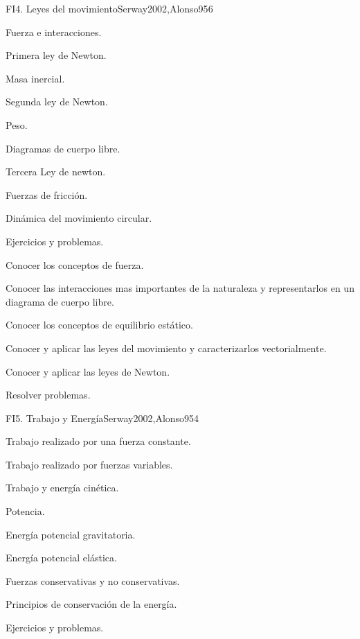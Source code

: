 \begin{sumilla}
\begin{unit}{FI4. Leyes del movimiento}{Serway2002,Alonso95}{6}
\begin{topicos}
      \item Fuerza e interacciones.
      \item Primera ley de Newton.
      \item Masa inercial.
      \item Segunda ley de Newton.
      \item Peso.
      \item Diagramas de cuerpo libre.
      \item Tercera Ley de newton.
      \item Fuerzas de fricci\'on.
      \item Din\'amica del movimiento circular.
      \item Ejercicios y problemas.
   \end{topicos}

   \begin{objetivos}
      \item Conocer los conceptos de fuerza.
      \item Conocer las interacciones mas importantes de la naturaleza y representarlos en un diagrama de cuerpo libre.
      \item Conocer los conceptos de equilibrio est\'atico.
      \item Conocer y aplicar las leyes del movimiento y caracterizarlos vectorialmente.
      \item Conocer y aplicar las leyes de Newton.
      \item Resolver problemas.
   \end{objetivos}
\end{unit}

\begin{unit}{FI5. Trabajo y Energ\'ia}{Serway2002,Alonso95}{4}
\begin{topicos}
	\item Trabajo realizado por una fuerza constante.
	\item Trabajo realizado por fuerzas variables.
	\item Trabajo y energ\'ia cin\'etica.
	\item Potencia.
	\item Energ\'ia potencial gravitatoria.
	\item Energ\'ia potencial el\'astica.
	\item Fuerzas conservativas y no conservativas.
	\item Principios de conservaci\'on de la energ\'ia.
	\item Ejercicios y problemas.
\end{topicos}


\end{unit}
\end{sumilla}
